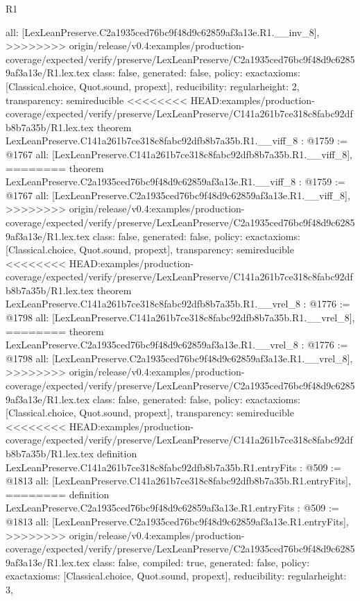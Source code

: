 \begin{lexlean}{R1}
\begin{coremodule}
{{{{{{{{{{{{  all: [LexLeanPreserve.C2a1935ced76bc9f48d9c62859af3a13e.R1.__inv_8],
>>>>>>>> origin/release/v0.4:examples/production-coverage/expected/verify/preserve/LexLeanPreserve/C2a1935ced76bc9f48d9c62859af3a13e/R1.lex.tex
  class: false,
  generated: false,
  policy: exact{axioms: [Classical.choice, Quot.sound, propext]},
  reducibility: regular{height: 2},
  transparency: semireducible
}
<<<<<<<< HEAD:examples/production-coverage/expected/verify/preserve/LexLeanPreserve/C141a261b7ce318c8fabc92dfb8b7a35b/R1.lex.tex
theorem LexLeanPreserve.C141a261b7ce318c8fabc92dfb8b7a35b.R1.__viff_8 : @1759 := @1767 {
  all: [LexLeanPreserve.C141a261b7ce318c8fabc92dfb8b7a35b.R1.__viff_8],
========
theorem LexLeanPreserve.C2a1935ced76bc9f48d9c62859af3a13e.R1.__viff_8 : @1759 := @1767 {
  all: [LexLeanPreserve.C2a1935ced76bc9f48d9c62859af3a13e.R1.__viff_8],
>>>>>>>> origin/release/v0.4:examples/production-coverage/expected/verify/preserve/LexLeanPreserve/C2a1935ced76bc9f48d9c62859af3a13e/R1.lex.tex
  class: false,
  generated: false,
  policy: exact{axioms: [Classical.choice, Quot.sound, propext]},
  transparency: semireducible
}
<<<<<<<< HEAD:examples/production-coverage/expected/verify/preserve/LexLeanPreserve/C141a261b7ce318c8fabc92dfb8b7a35b/R1.lex.tex
theorem LexLeanPreserve.C141a261b7ce318c8fabc92dfb8b7a35b.R1.__vrel_8 : @1776 := @1798 {
  all: [LexLeanPreserve.C141a261b7ce318c8fabc92dfb8b7a35b.R1.__vrel_8],
========
theorem LexLeanPreserve.C2a1935ced76bc9f48d9c62859af3a13e.R1.__vrel_8 : @1776 := @1798 {
  all: [LexLeanPreserve.C2a1935ced76bc9f48d9c62859af3a13e.R1.__vrel_8],
>>>>>>>> origin/release/v0.4:examples/production-coverage/expected/verify/preserve/LexLeanPreserve/C2a1935ced76bc9f48d9c62859af3a13e/R1.lex.tex
  class: false,
  generated: false,
  policy: exact{axioms: [Classical.choice, Quot.sound, propext]},
  transparency: semireducible
}
<<<<<<<< HEAD:examples/production-coverage/expected/verify/preserve/LexLeanPreserve/C141a261b7ce318c8fabc92dfb8b7a35b/R1.lex.tex
definition LexLeanPreserve.C141a261b7ce318c8fabc92dfb8b7a35b.R1.entryFits : @509 := @1813 {
  all: [LexLeanPreserve.C141a261b7ce318c8fabc92dfb8b7a35b.R1.entryFits],
========
definition LexLeanPreserve.C2a1935ced76bc9f48d9c62859af3a13e.R1.entryFits : @509 := @1813 {
  all: [LexLeanPreserve.C2a1935ced76bc9f48d9c62859af3a13e.R1.entryFits],
>>>>>>>> origin/release/v0.4:examples/production-coverage/expected/verify/preserve/LexLeanPreserve/C2a1935ced76bc9f48d9c62859af3a13e/R1.lex.tex
  class: false,
  compiled: true,
  generated: false,
  policy: exact{axioms: [Classical.choice, Quot.sound, propext]},
  reducibility: regular{height: 3},
}}}}}}}}}}}}}}}
\end{coremodule}
\end{lexlean}

